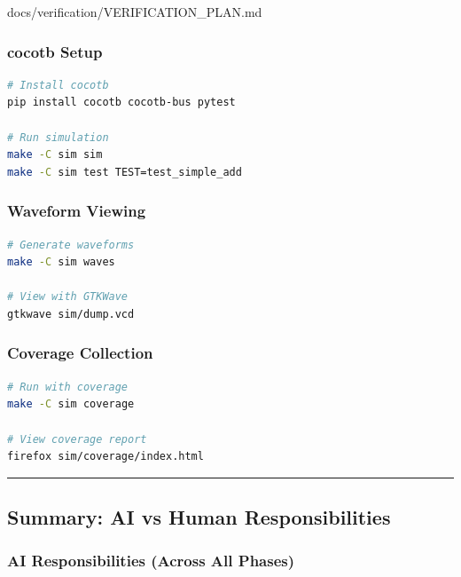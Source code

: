 \begin{relocated}{docs/verification/VERIFICATION_PLAN.md}
\subsubsection{cocotb Setup}\label{ds:ch:verification-plan:cocotb-setup}

\begin{lstlisting}[language=bash]
# Install cocotb
pip install cocotb cocotb-bus pytest

# Run simulation
make -C sim sim
make -C sim test TEST=test_simple_add
\end{lstlisting}

\subsubsection{Waveform Viewing}\label{ds:ch:verification-plan:waveform-viewing}

\begin{lstlisting}[language=bash]
# Generate waveforms
make -C sim waves

# View with GTKWave
gtkwave sim/dump.vcd
\end{lstlisting}

\subsubsection{Coverage Collection}\label{ds:ch:verification-plan:coverage-collection}

\begin{lstlisting}[language=bash]
# Run with coverage
make -C sim coverage

# View coverage report
firefox sim/coverage/index.html
\end{lstlisting}

\begin{center}\rule{0.5\linewidth}{0.5pt}\end{center}

\subsection{Summary: AI vs Human Responsibilities}\label{ds:ch:verification-plan:summary-ai-vs-human-responsibilities}

\subsubsection{AI Responsibilities (Across All Phases)}\label{ds:ch:verification-plan:ai-responsibilities-across-all-phases}


\end{relocated}
